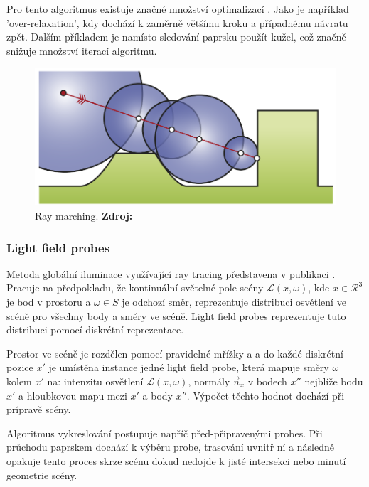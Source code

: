 Pro tento algoritmus existuje značné množství optimalizací \cite{Keinert2014EnhancedST}. Jako je například 'over-relaxation', kdy dochází k zaměrně většímu kroku a případnému návratu zpět. Dalším příkladem je namísto sledování paprsku použít kužel, což značně snižuje množství iterací algoritmu.

\begin{figure}[H]
	\centering
	\includegraphics[scale=0.8]{obrazky-figures/ray_marching.png}
	\caption{Ray marching. \textbf{Zdroj: \cite{Keinert2014EnhancedST}}}
	\label{fig:ray_marching}
\end{figure}


\subsubsection{Light field probes}
Metoda globální iluminace využívající ray tracing představena v publikaci \cite{light_field_probes}. Pracuje na předpokladu, že kontinuální světelné pole scény $\mathcal{L}(x, \omega)$, kde $x \in \mathcal{R}^3$ je bod v prostoru a $\omega \in S$ je odchozí směr, reprezentuje distribuci osvětlení ve scéně pro všechny body a směry ve scéně. Light field probes reprezentuje tuto distribuci pomocí diskrétní reprezentace.

Prostor ve scéně je rozdělen pomocí pravidelné mřížky a a do každé diskrétní pozice $x'$ je umístěna instance jedné light field probe, která mapuje směry $\omega$ kolem $x'$ na: intenzitu osvětlení $\mathcal{L}(x, \omega)$, normály $\vec{n}_x$ v bodech $x''$ nejblíže bodu $x'$ a hloubkovou mapu mezi $x'$ a body $x''$. Výpočet těchto hodnot dochází při prípravě scény.

Algoritmus vykreslování postupuje napříč před-připravenými probes. Při průchodu paprskem dochází k výběru probe, trasování uvnitř ní a následně opakuje tento proces skrze scénu dokud nedojde k jisté intersekci nebo minutí geometrie scény.

